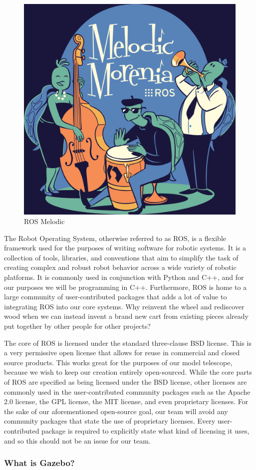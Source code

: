 \documentclass[12pt]{report}
\begin{document}
\begin{figure}[h]
	\centering
	\includegraphics[width=0.50\linewidth]{melodic}
	\caption{ROS Melodic}
\end{figure}

The Robot Operating System, otherwise referred to as ROS, is a flexible framework used for the purposes of writing software for robotic systems. It is a collection of tools, libraries, and conventions that aim to simplify the task of creating complex and robust robot behavior across a wide variety of robotic platforms.\cite{ROSDescription} It is commonly used in conjunction with Python and C++, and for our purposes we will be programming in C++. Furthermore, ROS is home to a large community of user-contributed packages that adds a lot of value to integrating ROS into our core systems. Why reinvent the wheel and rediscover wood when we can instead invent a brand new cart from existing pieces already put together by other people for other projects? 

The core of ROS is licensed under the standard three-clause BSD license. This is a very permissive open license that allows for reuse in commercial and closed source products. This works great for the purposes of our model telescope, because we wish to keep our creation entirely open-sourced. While the core parts of ROS are specified as being licensed under the BSD license, other licenses are commonly used in the user-contributed community packages such as the Apache 2.0 license, the GPL license, the MIT license, and even proprietary licenses. For the sake of our aforementioned open-source goal, our team will avoid any community packages that state the use of proprietary licenses. Every user-contributed package is required to explicitly state what kind of licensing it uses, and so this should not be an issue for our team. 

\subsubsection*{What is Gazebo?}
\end{document}
